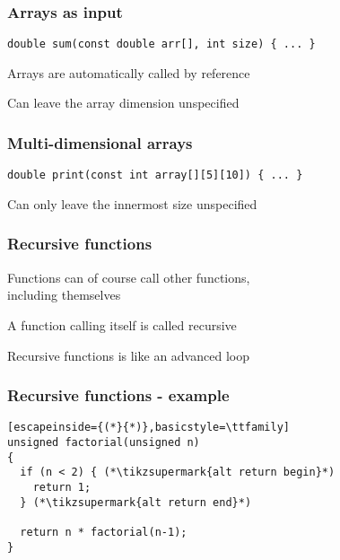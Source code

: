 \documentclass[14pt,a4paper,dvipsnames,usenames]{beamer}
\begin{document}
\begin{frame}[fragile]
  \frametitle{Arrays as input}

  \begin{lstlisting}
double sum(const double arr[], int size) { ... }
  \end{lstlisting}

  \vspace{1em}
  Arrays are automatically called by reference

  \vspace{1em}
  Can leave the array dimension unspecified
  
\end{frame}

\begin{frame}[fragile]
  \frametitle{Multi-dimensional arrays}

  \begin{lstlisting}
double print(const int array[][5][10]) { ... }
  \end{lstlisting}

  \vspace{1em}
  Can {\color{Marty}only} leave the innermost size unspecified
  
\end{frame}

\begin{frame}[fragile]
  \frametitle{Recursive functions}

  Functions can of course call other functions,\\including themselves

  \vspace{1em}
  A function calling itself is called {\color{Tropiteal}recursive}

  \vspace{1em}
  Recursive functions is like an advanced loop
  
\end{frame}

\begin{frame}[fragile]
  \frametitle{Recursive functions - example}


  \begin{lstlisting}[escapeinside={(*}{*)},basicstyle=\ttfamily]
unsigned factorial(unsigned n)
{
  if (n < 2) { (*\tikzsupermark{alt return begin}*)
    return 1;
  } (*\tikzsupermark{alt return end}*)

  return n * factorial(n-1);
}
  \end{lstlisting}

\end{frame}
\end{document}
